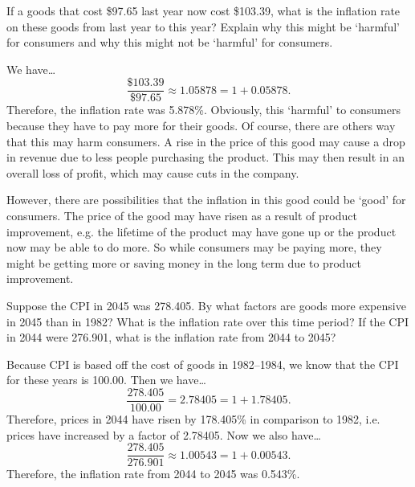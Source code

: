 \documentclass[11pt,letterpaper]{article}
\begin{document}
 If a goods that cost \$97.65 last year now cost \$103.39, what is the inflation rate on these goods from last year to this year? Explain why this might be `harmful' for consumers and why this might not be `harmful' for consumers. \pspace

\sol We have\dots 
	\[
	\dfrac{\$103.39}{\$97.65} \approx 1.05878= 1 + 0.05878.
	\] \pspace
Therefore, the inflation rate was 5.878\%. Obviously, this `harmful' to consumers because they have to pay more for their goods. Of course, there are others way that this may harm consumers. A rise in the price of this good may cause a drop in revenue due to less people purchasing the product. This may then result in an overall loss of profit, which may cause cuts in the company. \pspace

However, there are possibilities that the inflation in this good could be `good' for consumers. The price of the good may have risen as a result of product improvement, e.g. the lifetime of the product may have gone up or the product now may be able to do more. So while consumers may be paying more, they might be getting more or saving money in the long term due to product improvement. 



\newpage



 Suppose the CPI in 2045 was 278.405. By what factors are goods more expensive in 2045 than in 1982? What is the inflation rate over this time period? If the CPI in 2044 were 276.901, what is the inflation rate from 2044 to 2045? \pspace

\sol Because CPI is based off the cost of goods in 1982--1984, we know that the CPI for these years is 100.00. Then we have\dots
	\[
	\dfrac{278.405}{100.00}= 2.78405= 1 + 1.78405.
	\] \pspace
Therefore, prices in 2044 have risen by 178.405\% in comparison to 1982, i.e. prices have increased by a factor of 2.78405. Now we also have\dots \pspace
	\[
	\dfrac{278.405}{276.901} \approx 1.00543= 1 + 0.00543.
	\] \pspace
Therefore, the inflation rate from 2044 to 2045 was 0.543\%. 
\end{document}
